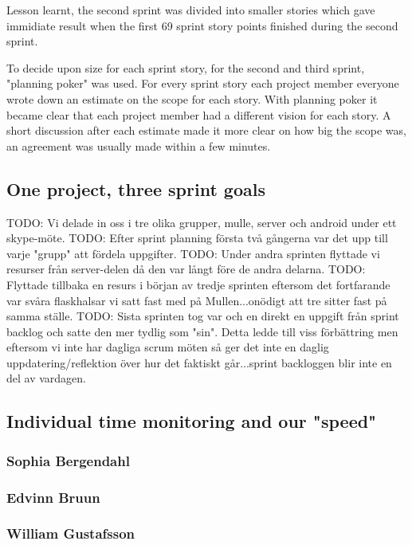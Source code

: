 Lesson learnt, the second sprint was divided into smaller stories which gave immidiate result when the first 69 sprint story points finished during the second sprint.

To decide upon size for each sprint story, for the second and third sprint, "planning poker" \cite[p.~42]{kniberg07} was used.
For every sprint story each project member everyone wrote down an estimate on the scope for each story.
With planning poker it became clear that each project member had a different vision for each story.
A short discussion after each estimate made it more clear on how big the scope was, an agreement was usually made within a few minutes.

%
%
\subsection{One project, three sprint goals}
TODO: Vi delade in oss i tre olika grupper, mulle, server och android under ett skype-möte.
TODO: Efter sprint planning första två gångerna var det upp till varje "grupp" att fördela uppgifter.
TODO: Under andra sprinten flyttade vi resurser från server-delen då den var långt före de andra delarna.
TODO: Flyttade tillbaka en resurs i början av tredje sprinten eftersom det fortfarande var svåra flaskhalsar vi satt fast med på Mullen...onödigt att tre sitter fast på samma ställe.
TODO: Sista sprinten tog var och en direkt en uppgift från sprint backlog och satte den mer tydlig som "sin". Detta ledde till viss förbättring men eftersom vi inte har dagliga scrum möten så ger det inte en daglig uppdatering/reflektion över hur det faktiskt går...sprint backloggen blir inte en del av vardagen.
\subsection{Individual time monitoring and our "speed"}
\subsubsection{Sophia Bergendahl}
\subsubsection{Edvinn Bruun}
\subsubsection{William Gustafsson}
